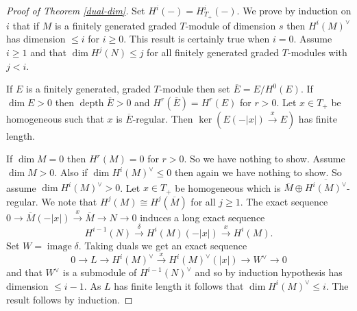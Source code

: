 \documentclass[10pt,a4paper]{amsart}
\newcommand{\depth}{\operatorname{depth}}
\newcommand{\image}{\operatorname{image}}
\newcommand{\ov}{\overline}
\newcommand{\rt}{\rightarrow}
\begin{document}
\begin{proof}[Proof of Theorem \ref{dual-dim}]
Set $H^i(-)  = H^i_{T_+}(-)$.
We prove by induction on $i$ that if $M$ is a finitely generated graded $T$-module of dimension $s$ then $H^i(M)^\vee $ has dimension $\leq i$ for $i \geq 0$.
This result is certainly true when $i = 0$.
Assume $i \geq 1$ and that $\dim H^j(N) \leq j$ for all finitely generated graded $T$-modules with $j < i$.

If $E$ is a finitely generated, graded $T$-module then set $\ov{E} = E/H^0(E)$. If $\dim E > 0$ then $\depth \ov{E} > 0$ and $H^r(\ov{E}) = H^r(E)$ for $r > 0$. Let $x \in T_+$ be homogeneous such that $x$ is $\ov{E}$-regular. Then $\ker (E(-|x|) \xrightarrow{x} E)$ has finite length.

If $\dim M = 0$ then $H^r(M) = 0$ for $r > 0$. So we have nothing to show. Assume $\dim M > 0$.
Also if $\dim H^i(M)^\vee \leq 0$ then again  we have nothing to show. So assume $\dim H^i(M)^\vee > 0$. Let $x \in T_+$ be homogeneous which is $\ov{M} \oplus \ov{H^i(M)^\vee}$-regular.
We note that $H^j(M) \cong H^j(\ov{M})$ for all $j \geq 1$.
The exact sequence $0 \rt \ov{M}(-|x|) \xrightarrow{x} \ov{M} \rt N \rt 0$ induces a long
exact sequence
$$H^{i-1}(N) \xrightarrow{\delta} H^i(M)(-|x|) \xrightarrow{x} H^i(M).$$
Set $W = \image \delta$. Taking duals we get an exact sequence
$$ 0 \rt L \rt H^i(M)^\vee \xrightarrow{x} H^i(M)^\vee(|x|) \rt W^\vee \rt 0$$
and that $W^\vee $ is a submodule of $H^{i-1}(N)^\vee$ and so by induction hypothesis  has dimension $\leq i -1$. As $L$ has finite length it follows that $\dim H^i(M)^\vee \leq i$. The result follows by induction.
\end{proof}
\end{document}
